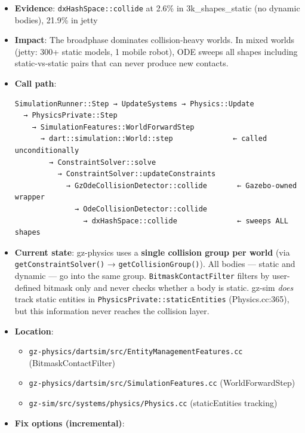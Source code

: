 \documentclass[11pt, a4paper]{article}
\providecommand{\tightlist}{%
  \setlength{\itemsep}{0pt}\setlength{\parskip}{0pt}}
\begin{document}
\begin{itemize}
\item
  \textbf{Evidence}: \texttt{dxHashSpace::collide} at 2.6\% in
  3k\_shapes\_static (no dynamic bodies), 21.9\% in jetty
\item
  \textbf{Impact}: The broadphase dominates collision-heavy worlds. In
  mixed worlds (jetty: 300+ static models, 1 mobile robot), ODE sweeps
  all shapes including static-vs-static pairs that can never produce new
  contacts.
\item
  \textbf{Call path}:

\begin{verbatim}
SimulationRunner::Step → UpdateSystems → Physics::Update
  → PhysicsPrivate::Step
    → SimulationFeatures::WorldForwardStep
      → dart::simulation::World::step              ← called unconditionally
        → ConstraintSolver::solve
          → ConstraintSolver::updateConstraints
            → GzOdeCollisionDetector::collide       ← Gazebo-owned wrapper
              → OdeCollisionDetector::collide
                → dxHashSpace::collide              ← sweeps ALL shapes
\end{verbatim}
\item
  \textbf{Current state}: gz-physics uses a \textbf{single collision
  group per world} (via \texttt{getConstraintSolver()} →
  \texttt{getCollisionGroup()}). All bodies --- static and dynamic ---
  go into the same group. \texttt{BitmaskContactFilter} filters by
  user-defined bitmask only and never checks whether a body is static.
  gz-sim \emph{does} track static entities in
  \texttt{PhysicsPrivate::staticEntities} (Physics.cc:365), but this
  information never reaches the collision layer.
\item
  \textbf{Location}:

  \begin{itemize}
  \tightlist
  \item
    \texttt{gz-physics/dartsim/src/EntityManagementFeatures.cc}
    (BitmaskContactFilter)
  \item
    \texttt{gz-physics/dartsim/src/SimulationFeatures.cc}
    (WorldForwardStep)
  \item
    \texttt{gz-sim/src/systems/physics/Physics.cc} (staticEntities
    tracking)
  \end{itemize}
\item
  \textbf{Fix options (incremental)}:


\end{itemize}
\end{document}
